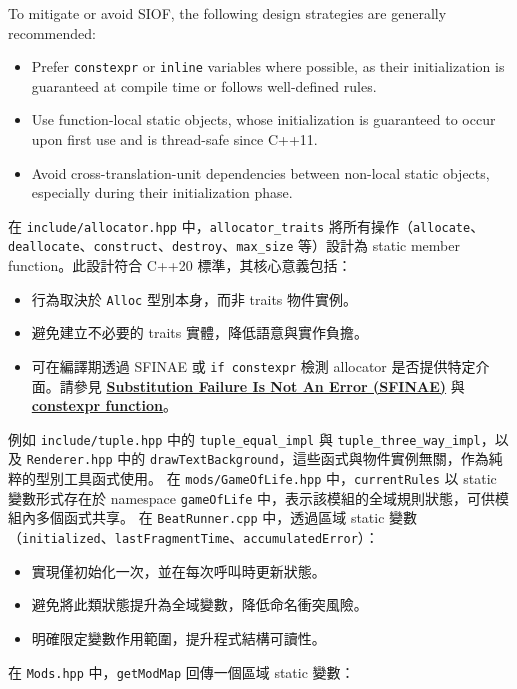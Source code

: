 \documentclass[a4paper,12pt]{article}
\begin{document}
To mitigate or avoid SIOF, the following design strategies are generally recommended:
\begin{itemize}
\item Prefer \verb|constexpr| or \verb|inline| variables where possible, as their initialization is guaranteed at compile time or follows well-defined rules.
\item Use function-local static objects, whose initialization is guaranteed to occur upon first use and is thread-safe since C++11.
\item Avoid cross-translation-unit dependencies between non-local static objects, especially during their initialization phase.
\end{itemize}
在 \verb|include/allocator.hpp| 中，\verb|allocator_traits| 將所有操作（\verb|allocate|、\verb|deallocate|、\verb|construct|、\verb|destroy|、\verb|max_size| 等）設計為 static member function。此設計符合 C++20 標準，其核心意義包括：
\begin{itemize}
  \item 行為取決於 \verb|Alloc| 型別本身，而非 traits 物件實例。
  \item 避免建立不必要的 traits 實體，降低語意與實作負擔。
  \item 可在編譯期透過 SFINAE 或 \verb|if constexpr| 檢測 allocator 是否提供特定介面。請參見 \hyperref[sfinae]{\textbf{Substitution Failure Is Not An Error (SFINAE)}} 與 \hyperref[constexpr]{\textbf{constexpr function}}。
\end{itemize}
例如 \verb|include/tuple.hpp| 中的 \verb|tuple_equal_impl| 與 \verb|tuple_three_way_impl|，以及 \verb|Renderer.hpp| 中的 \verb|drawTextBackground|，這些函式與物件實例無關，作為純粹的型別工具函式使用。
在 \verb|mods/GameOfLife.hpp| 中，\verb|currentRules| 以 static 變數形式存在於 namespace \verb|gameOfLife| 中，表示該模組的全域規則狀態，可供模組內多個函式共享。
在 \verb|BeatRunner.cpp| 中，透過區域 static 變數（\verb|initialized|、\verb|lastFragmentTime|、\verb|accumulatedError|）：
\begin{itemize}
  \item 實現僅初始化一次，並在每次呼叫時更新狀態。
  \item 避免將此類狀態提升為全域變數，降低命名衝突風險。
  \item 明確限定變數作用範圍，提升程式結構可讀性。
\end{itemize}
在 \verb|Mods.hpp| 中，\verb|getModMap| 回傳一個區域 static 變數：
\end{document}
